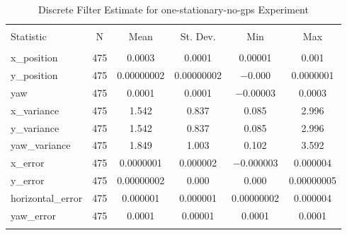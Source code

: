 
\begin{table}[h] \centering 
  \caption{Discrete Filter Estimate for one-stationary-no-gps Experiment} 
  \label{tab:one_stationary_no_gps_discrete_summary} 
\begin{tabular}{@{\extracolsep{5pt}}lccccc} 
\\[-1.8ex]\hline 
\hline \\[-1.8ex] 
Statistic & \multicolumn{1}{c}{N} & \multicolumn{1}{c}{Mean} & \multicolumn{1}{c}{St. Dev.} & \multicolumn{1}{c}{Min} & \multicolumn{1}{c}{Max} \\ 
\hline \\[-1.8ex] 
x\_position & 475 & \num{0.0003} & \num{0.0001} & \num{0.00001} & \num{0.001} \\ 
y\_position & 475 & \num{0.00000002} & \num{0.00000002} & $-$0.000 & \num{0.0000001} \\ 
yaw & 475 & \num{0.0001} & \num{0.0001} & $-$0.00003 & \num{0.0003} \\ 
x\_variance & 475 & \num{1.542} & \num{0.837} & \num{0.085} & \num{2.996} \\ 
y\_variance & 475 & \num{1.542} & \num{0.837} & \num{0.085} & \num{2.996} \\ 
yaw\_variance & 475 & \num{1.849} & \num{1.003} & \num{0.102} & \num{3.592} \\ 
x\_error & 475 & \num{0.0000001} & \num{0.000002} & $-$0.000003 & \num{0.000004} \\ 
y\_error & 475 & \num{0.00000002} & \num{0.000} & \num{0.000} & \num{0.00000005} \\ 
horizontal\_error & 475 & \num{0.000001} & \num{0.000001} & \num{0.00000002} & \num{0.000004} \\ 
yaw\_error & 475 & \num{0.0001} & \num{0.00001} & \num{0.0001} & \num{0.0001} \\ 
\hline \\[-1.8ex] 
\end{tabular} 
\end{table} 
